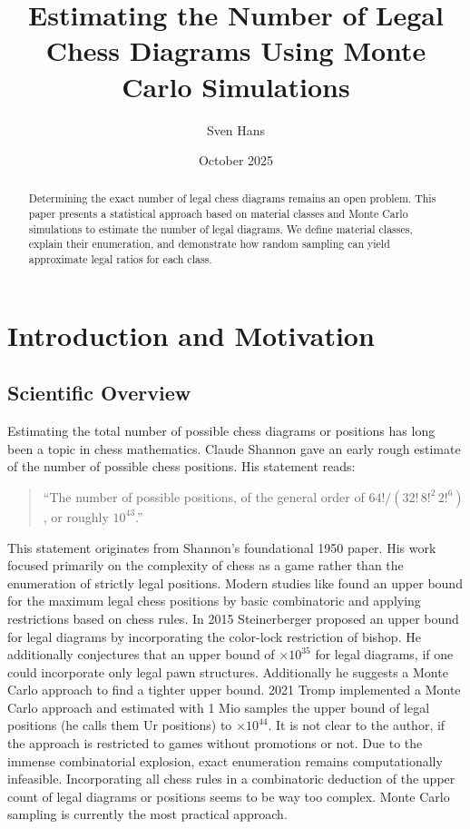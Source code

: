 \documentclass[12pt]{article}
\title{Estimating the Number of Legal Chess Diagrams Using Monte Carlo Simulations}
\author{Sven Hans}
\date{October 2025}
\begin{document}
\maketitle

\begin{abstract}
Determining the exact number of legal chess diagrams remains an open problem. This paper presents a statistical approach based on material classes and Monte Carlo simulations to estimate the number of legal diagrams. We define material classes, explain their enumeration, and demonstrate how random sampling can yield approximate legal ratios for each class.
\end{abstract}

\section{Introduction and Motivation}

\subsection{Scientific Overview}

Estimating the total number of possible chess diagrams or positions has long been a topic in chess mathematics. Claude Shannon \cite{shannon1950} gave an early rough estimate of the number of possible chess positions. His statement reads:

\begin{quote}
``The number of possible positions, of the general order of 
$64! / (32! \, 8!^2 \, 2!^6)$, or roughly $10^{43}$.''
\end{quote}

This statement originates from Shannon’s foundational 1950 paper. His work focused primarily on the complexity of chess as a game rather than the enumeration of strictly legal positions. 
Modern studies like \cite{chinchalker1996} found an upper bound for the maximum legal chess positions by basic combinatoric and applying restrictions based on chess rules. In 2015 Steinerberger \cite{steinnerberger2015} proposed an upper bound for legal diagrams by incorporating the color-lock restriction of bishop. He additionally conjectures that an upper bound of $\times10^{35}$ for legal diagrams, if one could incorporate only legal pawn structures. Additionally he suggests a Monte Carlo approach to find a tighter upper bound.
2021 Tromp \cite{tromp2021b} implemented a Monte Carlo approach and estimated with 1 Mio samples the upper bound of legal positions (he calls them Ur positions) to $\times10^{44}$. It is not clear to the author, if the approach is restricted to games without promotions or not. 
Due to the immense combinatorial explosion, exact enumeration remains computationally infeasible. Incorporating all chess rules in a combinatoric deduction of the upper count of legal diagrams or positions seems to be way too complex. Monte Carlo sampling is currently the most practical approach.
\end{document}
